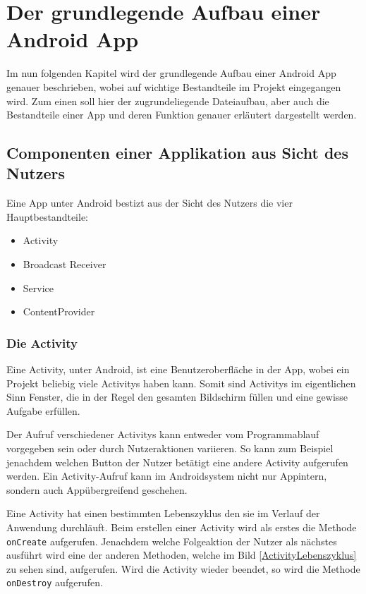 \section{Der grundlegende Aufbau einer Android App}
Im nun folgenden Kapitel wird der grundlegende Aufbau einer Android App genauer beschrieben, wobei auf wichtige Bestandteile im Projekt eingegangen wird.
Zum einen soll hier der zugrundeliegende Dateiaufbau, aber auch die Bestandteile einer App und deren Funktion genauer erl\"autert dargestellt werden. \cite{Android44}

\subsection{Componenten einer Applikation aus Sicht des Nutzers}
Eine App unter Android bestizt aus der Sicht des Nutzers die vier Hauptbestandteile:
\begin{itemize}
 \item Activity
 \item Broadcast Receiver
 \item Service
 \item ContentProvider
\end{itemize}

\subsubsection{Die Activity} \label{Die Activity aus Nutzersicht}
Eine Activity, unter Android, ist eine Benutzeroberfl\"ache in der App, wobei ein Projekt beliebig viele Activitys haben kann. Somit sind Activitys im eigentlichen Sinn Fenster, die in der Regel den gesamten Bildschirm f\"ullen und eine gewisse Aufgabe erf\"ullen. \cite{Kuehn12}

Der Aufruf verschiedener Activitys kann entweder vom Programmablauf vorgegeben sein oder durch Nutzeraktionen variieren. So kann zum Beispiel jenachdem welchen Button der Nutzer bet\"atigt eine andere Activity aufgerufen werden. Ein Activity-Aufruf kann im Androidsystem nicht nur Appintern, sondern auch App\"ubergreifend geschehen. \cite{Android44}

Eine Activity hat einen bestimmten Lebenszyklus den sie im Verlauf der Anwendung durchl\"auft. Beim erstellen einer Activity wird als erstes die Methode \texttt{onCreate} aufgerufen. Jenachdem welche Folgeaktion der Nutzer als n\"achstes ausf\"uhrt wird eine der anderen Methoden, welche im Bild \ref{ActivityLebenszyklus} zu sehen sind, aufgerufen. Wird die Activity wieder beendet, so wird die Methode \texttt{onDestroy} aufgerufen. 

